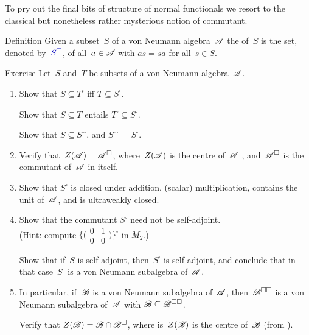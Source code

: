 \documentclass[a]{subfiles}
\begin{document}
\begin{parsec}%
\begin{point}%
To pry out the final bits of structure of normal functionals
we resort to the classical but nonetheless rather mysterious notion
of commutant.
\end{point}
\begin{point}[commutant]{Definition}%
Given a subset~$S$ of a von Neumann algebra~$\mathscr{A}$
the  of~$S$
is the set, denoted by~$\Define{S^\square}$,
of all~$a\in\mathscr{A}$ with $as=sa$ for all~$s\in S$.
\end{point}
\begin{point}{Exercise}%
Let~$S$ and~$T$ be subsets of a von Neumann algebra~$\mathscr{A}$.
\begin{enumerate}
\item
Show that $S \subseteq T^\square$ iff $T \subseteq S^\square$.

Show that $S\subseteq T$ entails $T^\square \subseteq S^\square$.

Show that $S\subseteq S^{\square\square}$,
and  $S^{\square\square\square}=S^\square$.
\item
Verify that~$Z(\mathscr{A})=\mathscr{A}^\square$,
where~$Z(\mathscr{A})$ is the centre of~$\mathscr{A}$ ,
and~$\mathscr{A}^\square$ is the commutant of~$\mathscr{A}$ in itself.
\item
Show that $S^\square$ is closed under addition,
(scalar) multiplication,
contains the unit of~$\mathscr{A}$,
and is ultraweakly closed.
\item
Show that the commutant $S^\square$ need not be self-adjoint.\\
(Hint: compute 
$\{\bigl(\begin{smallmatrix}0&1\\0&0\end{smallmatrix}\bigr)\}^\square$
in $M_2$.)

Show that if~$S$ is self-adjoint,
then~$S^\square$ is self-adjoint,
and conclude that in that case~$S^\square$
is a von Neumann subalgebra of~$\mathscr{A}$.

\item
In particular,
if~$\mathscr{B}$ is a von Neumann subalgebra of~$\mathscr{A}$,
then~$\mathscr{B}^{\square\square}$
is a von Neumann subalgebra of~$\mathscr{A}$
with $\mathscr{B}\subseteq \mathscr{B}^{\square\square}$.

Verify that $Z(\mathscr{B})=\mathscr{B}\cap \mathscr{B}^{\square}$,
where is~$Z(\mathscr{B})$ is the centre of~$\mathscr{B}$
(from ).



\end{enumerate}
\end{point}
\end{parsec}
\end{document}
